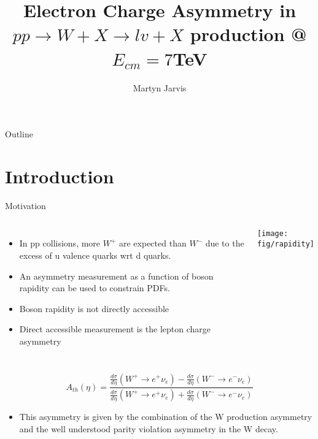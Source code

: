 \documentclass[t, 8pt]{beamer}
\author{Martyn Jarvis}
\title[Electron Charge Asymmetry]{Electron Charge Asymmetry in $pp \to W+X \to
lv + X$ production @ $E_{cm} = 7$TeV}
\begin{document}
\begin{frame}
  \titlepage
\end{frame}

\begin{frame}{Outline}
  \tableofcontents
\end{frame}

\section{Introduction}

\begin{frame}{Motivation}
  \begin{columns}[c]
  \begin{itemize}
    \item In pp collisions, more $W^+$ are expected than $W^-$ due to the excess of u valence quarks wrt d quarks.
    \item An asymmetry measurement as a function of boson rapidity can be used to constrain PDFs.
    \item Boson rapidity is not directly accessible
    \item Direct accessible measurement is the lepton charge asymmetry
  \end{itemize}
    \texttt{[image: fig/rapidity]}
  \end{columns}

    \begin{equation}
    A_{th}(\eta) = \frac{\frac{d\sigma}{d\eta}(W^{+}\to e^{+}\nu_{e}) - \frac{d\sigma}{d\eta}(W^{-}\to e^{-}\nu_{e})}
                        {\frac{d\sigma}{d\eta}(W^{+}\to e^{+}\nu_{e}) + \frac{d\sigma}{d\eta}(W^{-}\to e^{-}\nu_{e})}
    \end{equation}
  \begin{itemize}
    \item This asymmetry is given by the combination of the W production asymmetry and the well understood parity violation asymmetry in the W decay.
  \end{itemize}
\end{frame}

\end{document}
